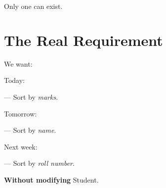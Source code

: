 \documentclass[11pt,a4paper]{book}
\begin{document}
Only one can exist.


\section{The Real Requirement}

We want:


Today:

    --- Sort by \emph{marks}.


Tomorrow:

    --- Sort by \emph{name}.


Next week:

    --- Sort by \emph{roll number}.

\textbf{Without modifying} \textcolor{RosettaRoyalPurple}{Student}.














\end{document}
